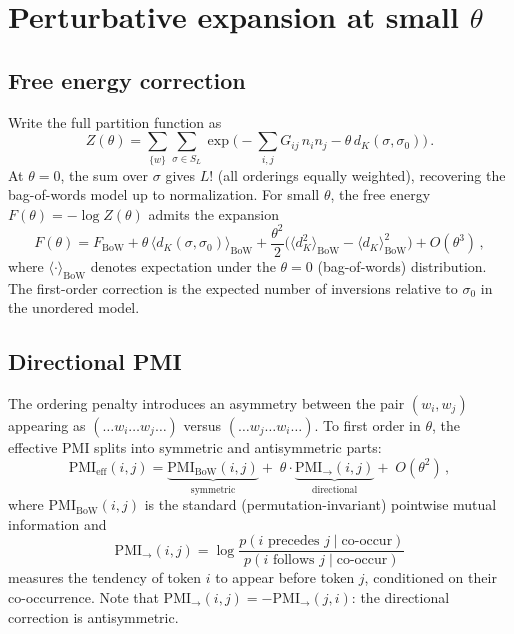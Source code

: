 \documentclass[11pt]{article}
\newcommand{\PMI}{\mathrm{PMI}}
\newcommand{\BoW}{\mathrm{BoW}}
\begin{document}
\section{Perturbative expansion at small $\theta$}

\subsection{Free energy correction}

Write the full partition function as
\begin{equation}
    Z(\theta) = \sum_{\{w\}} \sum_{\sigma \in S_L} \exp\!\Big(-\sum_{i,j} G_{ij}\, n_i n_j - \theta\, d_K(\sigma, \sigma_0)\Big)\,.
\end{equation}
At $\theta = 0$, the sum over $\sigma$ gives $L!$ (all orderings equally weighted), recovering the bag-of-words model up to normalization. For small $\theta$, the free energy $F(\theta) = -\log Z(\theta)$ admits the expansion
\begin{equation}\label{eq:free-energy}
    F(\theta) = F_{\BoW} + \theta\, \langle d_K(\sigma, \sigma_0) \rangle_{\BoW} + \frac{\theta^2}{2}\Big(\langle d_K^2 \rangle_{\BoW} - \langle d_K \rangle_{\BoW}^2\Big) + O(\theta^3)\,,
\end{equation}
where $\langle \cdot \rangle_{\BoW}$ denotes expectation under the $\theta = 0$ (bag-of-words) distribution. The first-order correction is the expected number of inversions relative to $\sigma_0$ in the unordered model.

\subsection{Directional PMI}

The ordering penalty introduces an asymmetry between the pair $(w_i, w_j)$ appearing as $(\ldots w_i \ldots w_j \ldots)$ versus $(\ldots w_j \ldots w_i \ldots)$. To first order in $\theta$, the effective PMI splits into symmetric and antisymmetric parts:
\begin{equation}\label{eq:directional-pmi}
    \PMI_{\text{eff}}(i, j) = \underbrace{\PMI_{\BoW}(i, j)}_{\text{symmetric}} + \;\theta \cdot \underbrace{\PMI_{\to}(i, j)}_{\text{directional}} + \;O(\theta^2)\,,
\end{equation}
where $\PMI_{\BoW}(i,j)$ is the standard (permutation-invariant) pointwise mutual information and
\begin{equation}\label{eq:pmi-directional}
    \PMI_{\to}(i, j) = \log \frac{p(i \text{ precedes } j \mid \text{co-occur})}{p(i \text{ follows } j \mid \text{co-occur})}
\end{equation}
measures the tendency of token $i$ to appear before token $j$, conditioned on their co-occurrence. Note that $\PMI_{\to}(i,j) = -\PMI_{\to}(j,i)$: the directional correction is antisymmetric.
\end{document}

